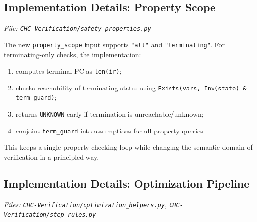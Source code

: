 \subsection*{Implementation Details: Property Scope}\label{subsec:property_scope}
\noindent\textit{\small File: \texttt{CHC-Verification/safety\_properties.py}}

The new \texttt{property\_scope} input supports \texttt{"all"} and
\texttt{"terminating"}. For terminating-only checks, the implementation:

\begin{enumerate}[leftmargin=1.5em]
	\item computes terminal PC as \texttt{len(ir)};
	\item checks reachability of terminating states using
	\texttt{Exists(vars, Inv(state) \& term\_guard)};
	\item returns \texttt{UNKNOWN} early if termination is unreachable/unknown;
	\item conjoins \texttt{term\_guard} into assumptions for all property queries.
\end{enumerate}

This keeps a single property-checking loop while changing the semantic domain of verification in a principled way.

\subsection*{Implementation Details: Optimization Pipeline}\label{subsec:opt_pipeline}
\noindent\textit{\small Files: \texttt{CHC-Verification/optimization\_helpers.py}, \texttt{CHC-Verification/step\_rules.py}}

